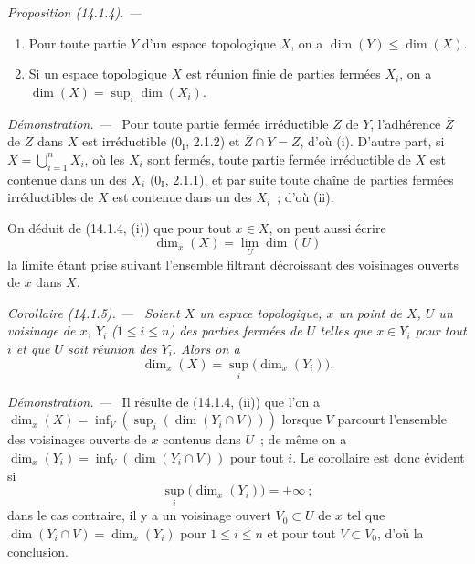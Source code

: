 \documentclass[10pt,oneside]{book}
\makeatletter
\newcommand{\setmanualcurrentlabel}[1]{\def\@currentlabel{#1}}
\newcommand{\oldpage}[2][]{%
  \setcounter{footnote}{0}%
  \marginpar{\scriptsize\textbf{#1}~|~#2}\ignorespaces}
\newenvironment{proposition}[1][]{%
  \setmanualcurrentlabel{#1}\par\medskip\noindent\itshape Proposition (#1). ---\ }{\par}
\newenvironment{corollary}[1][]{%
  \setmanualcurrentlabel{#1}\par\medskip\noindent\itshape Corollaire (#1). ---\ }{\par}
\newenvironment{proof}{%
  \par\medskip\noindent\textit{Démonstration. ---\ }}{\par}
\makeatother
\begin{document}
\begin{proposition}[14.1.4]
\label{0.14.1.4-fr}
\begin{enumerate}
  \item[\rm(i)] Pour toute partie $Y$ d'un espace topologique $X$, on a
  $\dim(Y)\leq\dim(X)$.
  \item[\rm(ii)] Si un espace topologique $X$ est réunion finie de parties
  fermées $X_i$, on a $\dim(X)=\sup_i\dim(X_i)$.
\end{enumerate}
\end{proposition}

\begin{proof}
Pour toute partie fermée irréductible $Z$ de $Y$, l'adhérence $\overline Z$ de
$Z$ dans $X$ est irréductible ($0_{\mathrm I}$, 2.1.2) et
$\overline Z\cap Y=Z$, d'où (i). D'autre part, si
$X=\bigcup_{i=1}^n X_i$, où les $X_i$ sont fermés, toute partie fermée
irréductible de $X$ est contenue dans un des $X_i$ ($0_{\mathrm I}$, 2.1.1),
et par suite toute chaîne de parties fermées irréductibles de $X$ est contenue
dans un des $X_i$~; d'où (ii).
\end{proof}

On déduit de (14.1.4, (i)) que pour tout $x\in X$, on peut aussi écrire
\[
  \dim_x(X)=\lim_U\dim(U)
  \tag{14.1.4.1}\label{0.14.1.4.1-fr}
\]
la limite étant prise suivant l'ensemble filtrant décroissant des voisinages
ouverts de $x$ dans $X$.

\oldpage[0\textsubscript{IV-1}]{7}
\begin{corollary}[14.1.5]
\label{0.14.1.5-fr}
Soient $X$ un espace topologique, $x$ un point de $X$, $U$ un voisinage de
$x$, $Y_i$ ($1\leq i\leq n$) des parties fermées de $U$ telles que
$x\in Y_i$ pour tout $i$ et que $U$ soit réunion des $Y_i$. Alors on a
\[
  \dim_x(X)=\sup_i\bigl(\dim_x(Y_i)\bigr).
  \tag{14.1.5.1}\label{0.14.1.5.1-fr}
\]
\end{corollary}

\begin{proof}
Il résulte de (14.1.4, (ii)) que l'on a
$\dim_x(X)=\inf_V(\sup_i(\dim(Y_i\cap V)))$ lorsque $V$ parcourt l'ensemble
des voisinages ouverts de $x$ contenus dans $U$~; de même on a
$\dim_x(Y_i)=\inf_V(\dim(Y_i\cap V))$ pour tout $i$. Le corollaire est donc
évident si
\[
  \sup_i\bigl(\dim_x(Y_i)\bigr)=+\infty~;
\]
dans le cas contraire, il y a un voisinage ouvert $V_0\subset U$ de $x$ tel
que $\dim(Y_i\cap V)=\dim_x(Y_i)$ pour $1\leq i\leq n$ et pour tout
$V\subset V_0$, d'où la conclusion.
\end{proof}
\end{document}
